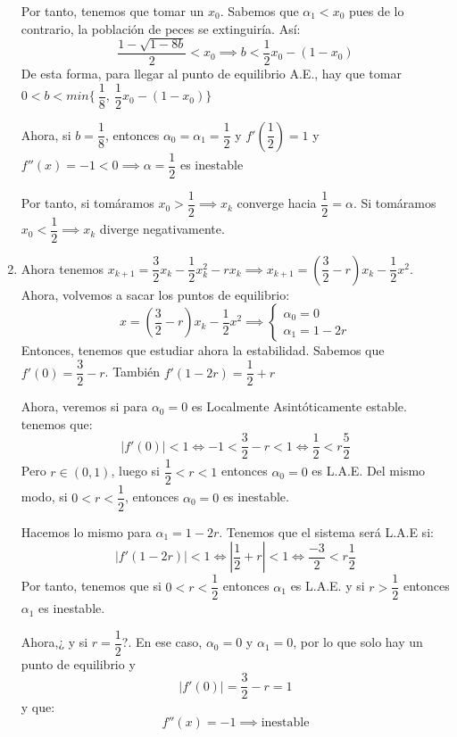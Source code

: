 \begin{ejemplo}
\begin{enumerate}
	Por tanto, tenemos que tomar un $x_0$. Sabemos que $\alpha_1 < x_0$ pues de lo contrario, la población de peces se extinguiría. Así:
	\[
	\frac{1 - \sqrt{1-8b}}{2} < x_0 \implies b < \dfrac{1}{2}x_0 -(1-x_0)
	\]
	De esta forma, para llegar al punto de equilibrio A.E., hay que tomar $0 < b < min\{\ \dfrac{1}{8},\ \dfrac{1}{2}x_0 -(1-x_0) \}$

	Ahora, si $b= \dfrac{1}{8}$, entonces $\alpha_0 = \alpha_1 = \dfrac{1}{2}$ y $f'(\dfrac{1}{2}) = 1$ y $f''(x) = -1 < 0 \implies \alpha= \dfrac{1}{2}$ es inestable

	Por tanto, si tomáramos $x_0 > \dfrac{1}{2} \implies x_k$ converge hacia $\dfrac{1}{2} = \alpha$.
	Si tomáramos $x_0 < \dfrac{1}{2} \implies x_k$ diverge negativamente.

	\item Ahora tenemos $x_{k+1}= \dfrac{3}{2}x_k - \dfrac{1}{2} x_k^2 -rx_k \implies x_{k+1} = (\dfrac{3}{2}-r)x_k - \dfrac{1}{2}x^2$.
	Ahora, volvemos a sacar los puntos de equilibrio:
	\[
	x = (\dfrac{3}{2}-r)x_k - \dfrac{1}{2}x^2 \implies \begin{cases}
	\alpha_0 = 0\\
	\alpha_1 = 1-2r
\end{cases}
	\]
	Entonces, tenemos que estudiar ahora la estabilidad. Sabemos que $f'(0) = \dfrac{3}{2} -r$. También $f'(1-2r) = \dfrac{1}{2} + r$

	Ahora, veremos si para $\alpha_0 = 0$ es Localmente Asintóticamente estable. tenemos que:
	\[
	|f'(0)|<1 \iff -1 < \dfrac{3}{2}-r < 1 \iff \dfrac{1}{2} < r \dfrac{5}{2}
	\]
	Pero $r \in (0,1)$, luego si $\dfrac{1}{2} < r < 1$ entonces $\alpha_0 = 0$ es L.A.E. Del mismo modo, si $0 < r < \dfrac{1}{2}$, entonces $\alpha_0 = 0$ es inestable.

	Hacemos lo mismo para $\alpha_1 = 1-2r$.  Tenemos que el sistema será L.A.E si:
	\[
	|f'(1-2r)| < 1 \iff |\dfrac{1}{2}+r| < 1 \iff \dfrac{-3}{2} < r \dfrac{1}{2}
	\]
	Por tanto, tenemos que si $0 < r < \dfrac{1}{2}$ entonces $\alpha_1$ es L.A.E. y si $r> \dfrac{1}{2}$ entonces $\alpha_1$ es inestable.

	Ahora,¿ y si $r= \dfrac{1}{2}$?. En ese caso, $\alpha_0 = 0$ y $\alpha_1 = 0$, por lo que solo hay un punto de equilibrio y
	\[
	|f'(0)|= \dfrac{3}{2}-r = 1
	\]
	y que:
	\[
	f''(x) =  -1 \implies \text{inestable}
	\]
\end{enumerate}
\end{ejemplo}



